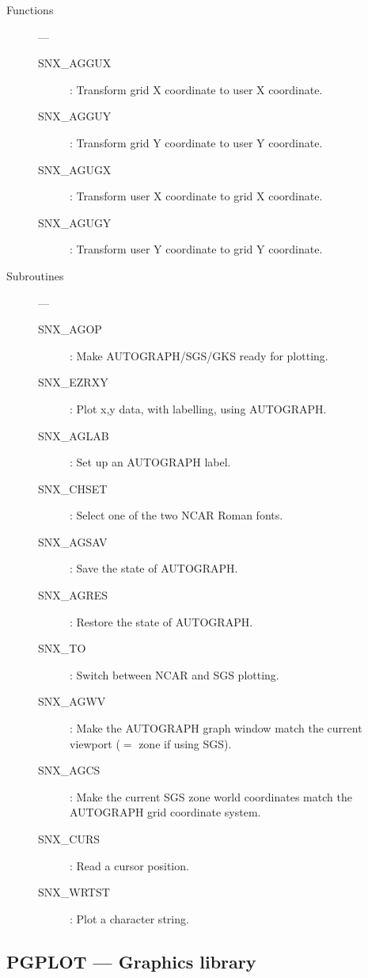 \begin{description}

\item [Functions] ---

\begin{description}
\item [SNX\_AGGUX] : Transform grid X coordinate to user X coordinate.
\item [SNX\_AGGUY] : Transform grid Y coordinate to user Y coordinate.
\item [SNX\_AGUGX] : Transform user X coordinate to grid X coordinate.
\item [SNX\_AGUGY] : Transform user Y coordinate to grid Y coordinate.
\end{description}

\item [Subroutines] ---

\begin{description}
\item [SNX\_AGOP] : Make AUTOGRAPH/SGS/GKS ready for plotting.
\item [SNX\_EZRXY] : Plot x,y data, with labelling, using AUTOGRAPH.
\item [SNX\_AGLAB] : Set up an AUTOGRAPH label.
\item [SNX\_CHSET] : Select one of the two NCAR Roman fonts.
\item [SNX\_AGSAV] : Save the state of AUTOGRAPH.
\item [SNX\_AGRES] : Restore the state of AUTOGRAPH.
\item [SNX\_TO] : Switch between NCAR and SGS plotting.
\item [SNX\_AGWV] : Make the AUTOGRAPH graph window match the current viewport
 ($=$ zone if using SGS).
\item [SNX\_AGCS] : Make the current SGS zone world coordinates match the
      AUTOGRAPH grid coordinate system.
\item [SNX\_CURS] : Read a cursor position.
\item [SNX\_WRTST] : Plot a character string.
\end{description}

\end{description}

\newpage

\subsection{PGPLOT --- Graphics library} 


